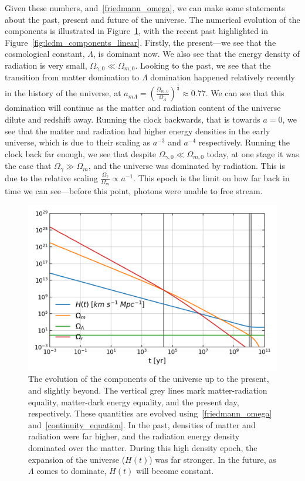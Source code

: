     Given these numbers, and~\eqref{friedmann_omega}, we can make some statements
    about the past, present and future of the universe.
    The numerical evolution of the components is illustrated in Figure~\ref{fig:lcdm_components},
    with the recent past highlighted in Figure~\ref{fig:lcdm_components_linear}.
    Firstly, the present---we see that the cosmological constant,
    $\Lambda$, is dominant now. We also see that the energy density of radiation
    is very small, $\Omega_{\gamma,0}\ll\Omega_{m,0}$.
    Looking to the past, we see that the transition from matter domination
    to $\Lambda$ domination happened relatively recently in the history of the universe,
    at $a_{m\Lambda}=\left(\frac{\Omega_{m,0}}{\Omega_{\Lambda}}\right)^{\frac{1}{3}}\approx0.77$.
    We can see that this domination will continue as the matter and radiation content of the
    universe dilute and redshift away.
    Running the clock backwards, that is towards $a=0$, we see that the matter and radiation had
    higher energy densities in the early universe, which is due to their scaling as $a^{-3}$ and $a^{-4}$
    respectively.
    Running the clock back far enough, we see
    that despite $\Omega_{\gamma,0}\ll\Omega_{m,0}$ today, at one stage it was the
    case that $\Omega_{\gamma}\gg\Omega_{m}$, and the universe was dominated by radiation.
    This is due to the relative scaling $\frac{\Omega_{\gamma}}{\Omega_{m}}\propto a^{-1}$.
    This epoch is the limit on how far back in time we can see---before this point,
    photons were unable to free stream.
\begin{figure}[h!]
\centering     %
    \includegraphics[width=.75\columnwidth]{plots/lcdm_components.png}
\caption{
    The evolution of the components of the universe up to the present, and slightly beyond.
    The vertical grey lines mark matter-radiation equality, matter-dark energy equality,
    and the present day, respectively.
    These quantities are evolved using~\eqref{friedmann_omega} and~\eqref{continuity_equation}.
    In the past, densities of matter and radiation were
    far higher, and the radiation energy density dominated over the matter.
    During this high density epoch, the expansion of the universe ($H(t)$) was far stronger.
    In the future, as $\Lambda$ comes to dominate, $H(t)$ will become constant.
}\label{fig:lcdm_components}
\end{figure}
